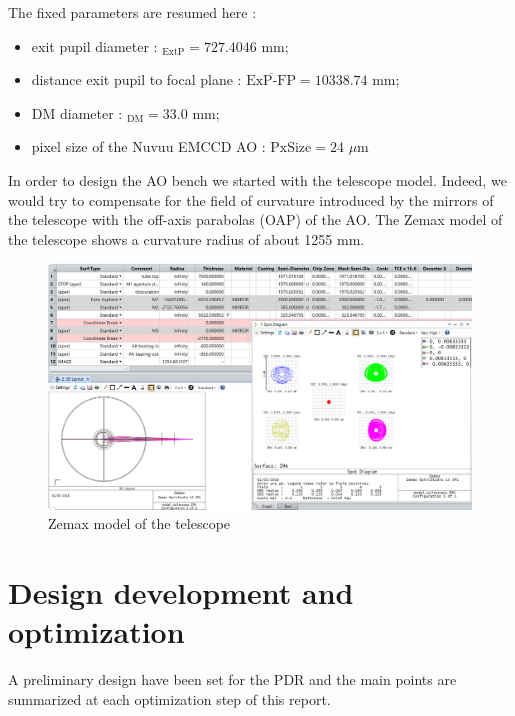 \documentclass[12pt,a4paper]{article}
\begin{document}
The fixed parameters are resumed here :
\begin{itemize}
	\item exit pupil diameter : \diameter$_{\text{ExtP}} = 727.4046$ mm;
	\item distance exit pupil to focal plane : $\overline{\text{ExP-FP}} = 10338.74$ mm; 
	\item DM diameter : \diameter$_{\text{DM}} = 33.0$ mm;
	\item pixel size of the Nuvuu EMCCD AO : $\text{PxSize} = 24$ $\mu$m
\end{itemize}
\newpage
In order to design the AO bench we started with the telescope model. Indeed, we would try to compensate for the field of curvature introduced by the mirrors of the telescope with the off-axis parabolas (OAP) of the AO. The Zemax model of the telescope shows a curvature radius of about 1255 mm.
\begin{figure}[H]
	\begin{center}
		\includegraphics[width=\textwidth]{images/Zemax_model_telescope.PNG}
		\caption{Zemax model of the telescope}\label{fig:Zemax_model_telescope}
	\end{center}
\end{figure}

\newpage
\section{Design development and optimization}
A preliminary design have been set for the PDR and the main points are summarized at each optimization step of this report.
\end{document}
